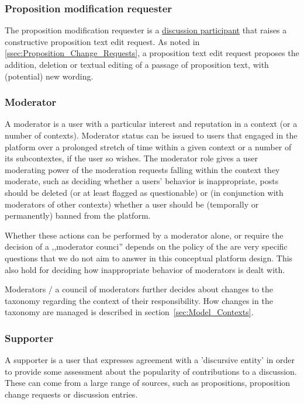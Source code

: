 \subsubsection{Proposition modification requester}
The proposition modification requester is a \hyperref[ssec:Roles_DiscussionParticipant]{discussion participant} that raises a constructive proposition text edit request. 
As noted in \ref{ssec:Proposition_Change_Requests}, a proposition text edit request proposes the addition, deletion or textual editing of a passage of proposition text, with (potential) new wording.

\subsubsection{Moderator}
\label{ssec:Roles_Moderator}
A moderator is a user with a particular interest and reputation in a context (or a number of contexts).
Moderator status can be issued to users that engaged in the platform over a prolonged stretch of time within a given context or a number of its subcontextes, if the user so wishes.
The moderator role gives a user moderating power of the moderation requests falling within the context they moderate, such as deciding whether a users' behavior is inappropriate, posts should be deleted (or at least flagged as questionable) or (in conjunction with moderators of other contexts) whether a user should be (temporally or permanently) banned from the platform.

Whether these actions can be performed by a moderator alone, or require the decision of a ,,moderator counci'' depends on the policy of the are very specific questions that we do not aim to answer in this conceptual platform design.
This also hold for deciding how inappropriate behavior of moderators is dealt with.

Moderators / a council of moderators further decides about changes to the taxonomy regarding the context of their responsibility.
How changes in the taxonomy are managed is described in section~\ref{sec:Model_Contexts}.

\subsubsection{Supporter}
\label{ssec:Roles_Supporter}
A supporter is a user that expresses agreement with a 'discursive entity' in order to provide some assessment about the popularity of contributions to a discussion.
These can come from a large range of sources, such as propositions, proposition change requests or discussion entries. 

